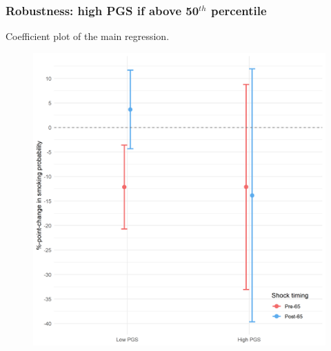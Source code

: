 \documentclass[10pt,compress,xcolor=dvipsnames,aspectratio=169]{beamer}    %
\newcounter{ex}
\newcommand{\1}[1]{\mathrm{1\hspace*{-2.5pt}l}[#1]}	%
\begin{document}
\begin{frame}
\frametitle{Robustness: high PGS if above 50$^{th}$ percentile}
Coefficient plot of the main regression.
\begin{figure}[hbtp]

\centering
\includegraphics[height=0.8\textheight]{../../3_output/shock_effects/robustness_6070_50pt_cv.png}
\label{fig:coeffplot50highPGS}
\end{figure}
\hyperlink{frame:robustness}{}
\end{frame}
\end{document}
